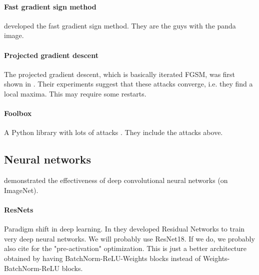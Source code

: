 \documentclass{article}
\begin{document}
\paragraph{Fast gradient sign method}
\cite{goodfellow2014explaining} developed the fast gradient sign method. They are the guys with the panda image.

\paragraph{Projected gradient descent}
The projected gradient descent, which is basically iterated FGSM, was first shown in \cite{madry2017towards}. Their experiments suggest that these attacks converge, i.e. they find a local maxima. This may require some restarts.

\paragraph{Foolbox}
A Python library with lots of attacks \cite{rauber2017foolbox}. They include the attacks above.

\subsection{Neural networks}

\cite{krizhevsky2012imagenet} demonstrated the effectiveness of deep convolutional neural networks (on ImageNet).

\paragraph{ResNets}
Paradigm shift in deep learning. In \cite{he2016deep} they developed Residual Networks to train very deep neural networks. We will probably use ResNet18. If we do, we probably also cite \cite{he2016identity} for the "pre-activation" optimization. This is just a better architecture obtained by having BatchNorm-ReLU-Weights blocks instead of Weights-BatchNorm-ReLU blocks.




\end{document}
